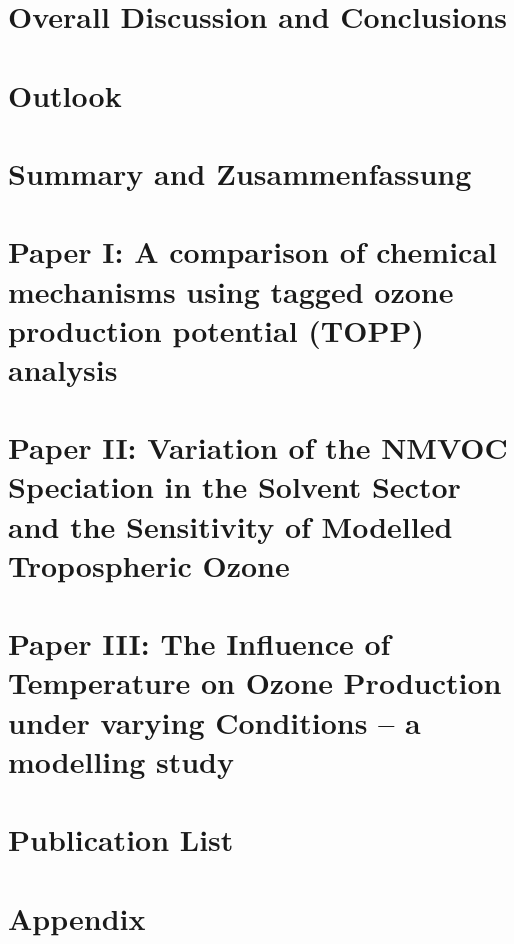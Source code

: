 \documentclass[12pt,twoside,openright,a4paper]{report}
\begin{document}
\chapter{Overall Discussion and Conclusions} \label{c:conclusions}

\clearpage{\pagestyle{empty}\cleardoublepage}

\chapter{Outlook} \label{c:outlook}

\clearpage{\pagestyle{empty}\cleardoublepage}

\chapter{Summary and Zusammenfassung} \label{c:summary}

\clearpage{\pagestyle{empty}\cleardoublepage}


 
\clearpage{\pagestyle{empty}\cleardoublepage}

\chapter{Paper I: A comparison of chemical mechanisms using tagged ozone production potential (TOPP) analysis} \label{c:paper_1}
\clearpage{\pagestyle{empty}\cleardoublepage}



\chapter{Paper II: Variation of the NMVOC Speciation in the Solvent Sector and the Sensitivity of Modelled Tropospheric Ozone} \label{c:paper_2}
\clearpage{\pagestyle{empty}\cleardoublepage}



\chapter{Paper III: The Influence of Temperature on Ozone Production under varying  Conditions -- a modelling study} \label{c:paper_3}
\clearpage{\pagestyle{empty}\cleardoublepage}

\chapter{Publication List}

\clearpage{\pagestyle{empty}\cleardoublepage}

\chapter*{Appendix}

\end{document}
